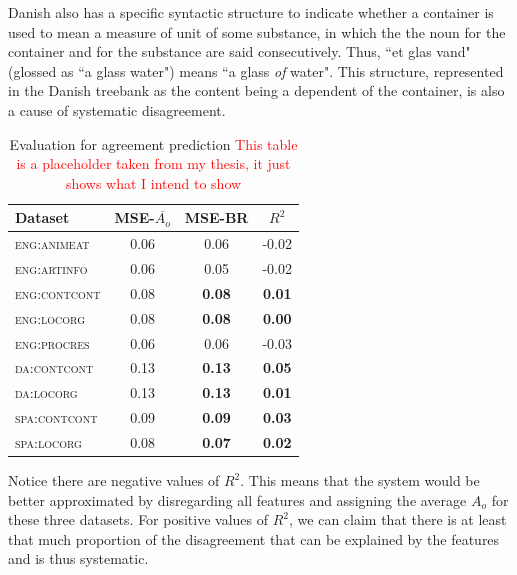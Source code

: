 \documentclass[11pt,a4paper]{article}
\begin{document}
Danish also has a specific syntactic structure to indicate whether a container is used to mean a measure of unit of some substance, in which the the noun for the container and for the substance are said consecutively. Thus, ``et glas vand" (glossed as ``a glass water") means ``a glass \textit{of} water". This structure, represented in the Danish treebank as the content being a dependent of the container, is also a cause of systematic disagreement. 



\begin{table}[Ht!]

\begin{center}
  \begin{tabular}{l ccc}
 \toprule


 Dataset& MSE-$\overline{A_o}$ & MSE-BR &  $R^2$\\
 \midrule

\textsc{eng:animeat} & 0.06 & 0.06 & -0.02  \\ 
\textsc{eng:artinfo} & 0.06 & 0.05  & -0.02  \\ 
\textsc{eng:contcont} & 0.08 & \textbf{0.08}  & \textbf{0.01}\\ 
\textsc{eng:locorg} & 0.08 & \textbf{0.08}  & \textbf{0.00}\\ 
\textsc{eng:procres} & 0.06 & 0.06  & -0.03 \\ 
\textsc{da:contcont} & 0.13 & \textbf{0.13} & \textbf{0.05}\\ 
\textsc{da:locorg} & 0.13 & \textbf{0.13} & \textbf{0.01}\\ 
\textsc{spa:contcont} & 0.09 & \textbf{0.09} & \textbf{0.03}\\ 
\textsc{spa:locorg}& 0.08 & \textbf{0.07} & \textbf{0.02}\\ 
\bottomrule

  \end{tabular}  
\end{center}
\caption{Evaluation for agreement prediction \label{tab:regagr_results} \textcolor{red}{This table is a placeholder taken from my thesis, it just shows what I intend to show}}
\end{table} 

Notice there are negative values of $R^2$. This means that the system would be better approximated by disregarding all features and assigning the average $A_o$ for these three datasets. For positive values of $R^2$, we can claim that there is at least that much proportion of the disagreement that can be explained by the features and is thus systematic.
\end{document}
